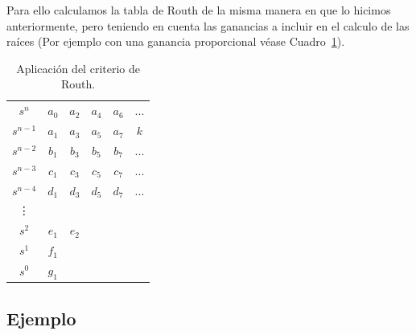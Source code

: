         Para ello calculamos la tabla de Routh de la misma manera en que lo hicimos anteriormente, pero teniendo en cuenta las ganancias a incluir en el calculo de las raíces (Por ejemplo con una ganancia proporcional véase Cuadro~\ref{tab:Aplicacion}).

        \begin{table}[htbp]
            \centering
            \begin{tabular}{c|c c c c c}
            $s^n$     & $a_0$ & $a_2$ & $a_4$ & $a_6$ & ...\\
            $s^{n-1}$ & $a_1$ & $a_3$ & $a_5$ & $a_7$ & $k$\\
            $s^{n-2}$ & $b_1$ & $b_3$ & $b_5$ & $b_7$ & ...\\
            $s^{n-3}$ & $c_1$ & $c_3$ & $c_5$ & $c_7$ & ...\\
            $s^{n-4}$ & $d_1$ & $d_3$ & $d_5$ & $d_7$ & ...\\
            \vdots                                         \\
            $s^2$ & $e_1$ & $e_2$                          \\
            $s^1$ & $f_1$                                  \\
            $s^0$ & $g_1$
            \end{tabular}
            \caption{\label{tab:Aplicacion}Aplicación del criterio de Routh.}
        \end{table}


        \subsection{Ejemplo}


